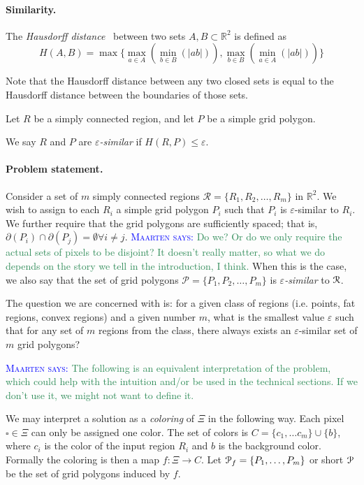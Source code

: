 \documentclass[a4paper, UKenglish]{lipics-v2018}
\newcommand{\mremark}[3]{\textcolor{blue}{\textsc{#1 #2:}} \textcolor{SeaGreen}{\textsf{#3}}}
\newcommand{\maarten}[2][says]{\mremark{Maarten}{#1}{#2}}
\newcommand{\pix}{\square}
\newcommand{\eps}{\varepsilon}
\newcommand{\R}{\mathbb{R}}
\begin{document}
\paragraph {Similarity.}

The {\em Hausdorff distance}~\cite{} between two sets $A, B \subset \R^2$ is defined as 
\[
  H(A, B) = \max \{\max_{a \in A}(\min_{b \in B}(|ab|)), \max_{b \in B}(\min_{a \in A}(|ab|))\}
\]

Note that the Hausdorff distance between any two closed sets is equal to the Hausdorff distance between the boundaries of those sets.

Let $R$ be a simply connected region, and let $P$ be a simple grid polygon.

\begin{definition}
We say $R$ and $P$ are {\em $\eps$-similar} if $H(R,P) \le \eps$. 
\end{definition}


\paragraph {Problem statement.}

Consider a set of $m$ simply connected regions $\mathcal{R} = \{R_1, R_2, \ldots, R_m\}$ in $\mathbb{R}^2$.
We wish to assign to each $R_i$ a simple grid polygon $P_i$ such that $P_i$ is $\eps$-similar to $R_i$.
We further require that the grid polygons are sufficiently spaced; that is, $\partial(P_i) \cap \partial(P_j) = \emptyset \forall i \ne j$. \maarten {Do we? Or do we only require the actual sets of pixels to be disjoint? It doesn't really matter, so what we do depends on the story we tell in the introduction, I think.}
When this is the case, we also say that the set of grid polygons $\mathcal{P} = \{P_1, P_2, \ldots, P_m\}$ is {\em $\eps$-similar} to $\cal R$.

The question we are concerned with is: for a given class of regions (i.e. points, fat regions, convex regions) and a given number $m$, what is the smallest value $\eps$ such that for any set of $m$ regions from the class, there always exists an $\eps$-similar set of $m$ grid polygons?

\maarten {The following is an equivalent interpretation of the problem, which could help with the intuition and/or be used in the technical sections. If we don't use it, we might not want to define it.}

We may interpret a solution as a {\em coloring} of $\Xi$ in the following way.
Each pixel $\pix\in\Xi$ can only be assigned one color. The set of colors is $C = \{c_1,\dots c_m\}\cup\{b\}$, where $c_i$ is the color of the input region $R_i$ and $b$ is the background color.
Formally the coloring is then a map $f:\Xi\to C$.
Let ${\cal P}_f=\{P_1,\dots, P_m\}$ or short ${\cal P}$ be the set of grid polygons induced by $f$.
\end{document}
